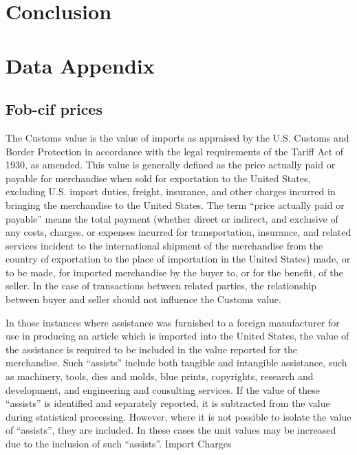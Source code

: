 \documentclass[a4paper,11pt]{article}
\begin{document}
\section{Conclusion \label{sec:conclu}}

\newpage




\newpage


\appendix

\section*{Data Appendix \label{app:data}}

\subsection{Fob-cif prices}

The Customs value is the value of imports as appraised by the U.S. Customs and Border Protection in accordance with the legal requirements of the Tariff Act of 1930, as amended. This value is generally defined as the price actually paid or payable for merchandise when sold for exportation to the United States, excluding U.S. import duties, freight, insurance, and other charges incurred in bringing the merchandise to the United States. The term ``price actually paid or payable'' means the total payment (whether direct or indirect, and exclusive of any costs, charges, or expenses incurred for transportation, insurance, and related services incident to the international shipment of the merchandise from the country of exportation to the place of importation in the United States) made, or to be made, for imported merchandise by the buyer to, or for the benefit, of the seller. In the case of transactions between related parties, the relationship between buyer and seller should not influence the Customs value.

In those instances where assistance was furnished to a foreign manufacturer for use in producing an article which is imported into the United States, the value of the assistance is required to be included in the value reported for the merchandise. Such ``assists'' include both tangible and intangible assistance, such as machinery, tools, dies and molds, blue prints, copyrights, research and development, and engineering and consulting services. If the value of these ``assists'' is identified and separately reported, it is subtracted from the value during statistical processing. However, where it is not possible to isolate the value of ``assists'', they are included. In these cases the unit values may be increased due to the inclusion of such ``assists''.
Import Charges
\end{document}
